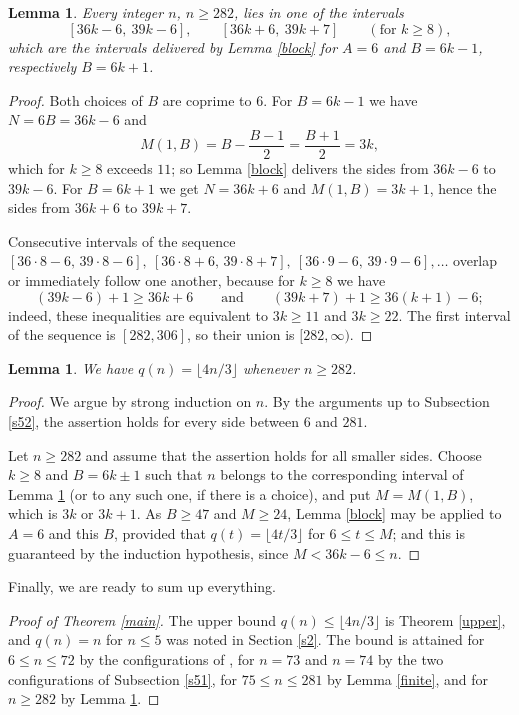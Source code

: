 \documentclass[10pt,a4paper]{article}
\newtheorem{lemma}[theorem]{Lemma}
\theoremstyle{definition}
\begin{document}
\begin{lemma}
\label{intervals}
Every integer $n$, $n\geqslant282$, lies in one of the intervals
\[
[36k-6,\ 39k-6],\qquad [36k+6,\ 39k+7]\qquad (\text{for $k\geqslant8$}),
\]
which are the intervals delivered by Lemma \ref{block} for $A=6$ and
$B=6k-1$, respectively $B=6k+1$.
\end{lemma}

\begin{proof}
Both choices of $B$ are coprime to $6$. For $B=6k-1$ we have $N=6B=36k-6$ and
\[
M(1,B)=B-\frac{B-1}2=\frac{B+1}2=3k,
\]
which for $k\geqslant8$ exceeds $11$; so Lemma \ref{block} delivers the sides
from $36k-6$ to $39k-6$. For $B=6k+1$ we get $N=36k+6$ and $M(1,B)=3k+1$,
hence the sides from $36k+6$ to $39k+7$.

Consecutive intervals of the sequence
$[36\cdot8-6,\,39\cdot8-6],\ [36\cdot8+6,\,39\cdot8+7],\ [36\cdot9-6,\,39\cdot9-6],\dots$
overlap or immediately follow one another, because for $k\geqslant8$ we have
\[
(39k-6)+1\geqslant36k+6\qquad\text{and}\qquad(39k+7)+1\geqslant36(k+1)-6;
\]
indeed, these inequalities are equivalent to $3k\geqslant11$ and $3k\geqslant22$. The first
interval of the sequence is $[282,306]$, so their union is $[282,\infty)$.
\end{proof}

\begin{lemma}
\label{tail}
We have $q(n)=\lfloor4n/3\rfloor$ whenever $n\geqslant282$.
\end{lemma}

\begin{proof}
We argue by strong induction on $n$. By the arguments up to Subsection \ref{s52}, the assertion holds for every side between $6$ and
$281$.

Let $n\geqslant282$ and assume that the assertion holds for all smaller sides. Choose
$k\geqslant8$ and $B=6k\pm1$ such that $n$ belongs to the corresponding interval of
Lemma \ref{intervals} (or to any such one, if there is a choice), and put $M=M(1,B)$, which is $3k$ or $3k+1$. As
$B\geqslant47$ and $M\geqslant24$, Lemma \ref{block} may be applied to $A=6$
and this $B$, provided that $q(t)=\lfloor4t/3\rfloor$ for $6\leqslant t\leqslant M$;
and this is guaranteed by the induction hypothesis, since $M<36k-6\leqslant n$.
\end{proof}

Finally, we are ready to sum up everything.

\begin{proof}[Proof of Theorem \ref{main}]
The upper bound $q(n)\leqslant\lfloor4n/3\rfloor$ is Theorem \ref{upper}, and
$q(n)=n$ for $n\leqslant5$ was noted in Section \ref{s2}. The bound is attained
for $6\leqslant n\leqslant72$ by the configurations of \cite{healy}, for
$n=73$ and $n=74$ by the two configurations of Subsection \ref{s51}, for
$75\leqslant n\leqslant281$ by Lemma \ref{finite}, and for $n\geqslant282$ by
Lemma \ref{tail}.
\end{proof}
\end{document}

